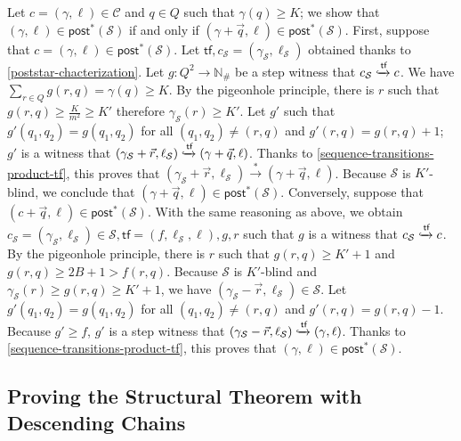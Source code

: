\documentclass[10pt,a4paper]{article}
\let\mathbb\mathds
\renewcommand{\geq}{\geqslant}
\newcommand{\nats}{\mathbb{N}}
\newcommand{\config}{\gamma}
\newcommand{\postop}{\mathsf{post}}
\newcommand{\poststar}[1]{\postop^*(#1)}
\newcommand{\step}[1]{\xrightarrow{#1}}
\newcommand*{\states}{Q}
\newcommand{\cSet}{\mathcal{S}}  %
\newcommand*{\abuchistate}{\ell}
\newcommand*{\bstate}{\abuchistate}
\newcommand{\prodconfigs}{\mathcal{C}}
\newcommand{\prodconfig}{c}
\newcommand*{\dummysymb}{\#}
\newcommand*{\natsanddummy}{\nats_{\dummysymb}}
\newcommand*{\atf}{\mathsf{tf}}
\newcommand*{\flowstep}[1]{\xhookrightarrow{#1}}
\begin{document}
Let \(\prodconfig = (\config, \bstate) \in \prodconfigs\) and \(q \in \states\) such that \(\config(q) \geq K\); we show that \((\config, \bstate) \in \poststar{\cSet}\) if and only if \((\config + \vec{q}, \bstate) \in \poststar{\cSet}\).
First, suppose that \(\prodconfig = (\config,\bstate) \in \poststar{\cSet}\).
Let \(\atf, \prodconfig_\cSet = (\config_\cSet, \bstate_\cSet)\) obtained thanks to \cref{poststar-chacterization}.
Let \(g : \states^2 \to \natsanddummy\) be a step witness that \(\prodconfig_\cSet \flowstep{\atf} \prodconfig\).
We have \(\sum_{r \in \states} g(r,q) = \config(q) \geq K\).
By the pigeonhole principle, there is \(r\) such that \(g(r,q) \geq \frac{K}{m^2} \geq K'\) therefore \(\config_\cSet(r) \geq K'\).
Let \(g'\) such that \(g'(q_1,q_2) = g(q_1,q_2)\) for all \((q_1,q_2) \ne (r,q)\) and \(g'(r,q) = g(r,q)+1\); \(g'\) is a witness that \((\config_\cSet+ \vec{r},\bstate_\cSet) \flowstep{\atf} (\config +\vec{q}, \bstate)\).
Thanks to \cref{sequence-transitions-product-tf}, this proves that \((\config_\cSet+ \vec{r},\bstate_\cSet) \step{*} (\config +\vec{q}, \bstate)\).
Because \(\cSet\) is \(K'\)-blind, we conclude that \((\config +\vec{q}, \bstate) \in \poststar{\cSet}\).
Conversely, suppose that \((\prodconfig + \vec{q}, \bstate) \in \poststar{\cSet}\).
With the same reasoning as above, we obtain \(\prodconfig_\cSet = (\config_\cSet, \bstate_\cSet)\in \cSet, \atf = (f, \bstate_\cSet, \bstate), g, r\) such that \(g\) is a witness that \(\prodconfig_\cSet \flowstep{\atf} \prodconfig\).
By the pigeonhole principle, there is \(r\) such that \(g(r,q) \geq K'+1\) and \(g(r,q) \geq 2B+1 > f(r,q)\).
Because \(\cSet\) is \(K'\)-blind and \(\config_\cSet(r) \geq g(r,q) \geq K' +1\), we have \((\config_\cSet- \vec{r},\bstate_\cSet) \in \cSet\).
Let \(g'(q_1,q_2) = g(q_1,q_2)\) for all \((q_1,q_2) \ne (r,q)\) and \(g'(r,q) = g(r,q)-1\).
Because \(g' \geq f\), \(g'\) is a step witness that \((\config_\cSet-\vec{r},\bstate_\cSet) \flowstep{\atf} (\config, \bstate)\).
Thanks to \cref{sequence-transitions-product-tf}, this proves that \((\config, \bstate) \in \poststar{\cSet}\).
%

%
\subsection{Proving the Structural Theorem with Descending Chains}
\label{subsec:stuctural-bound}
\end{document}
